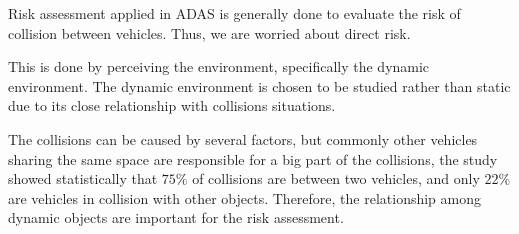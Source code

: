 Risk assessment applied in ADAS is generally done to evaluate the risk of collision between vehicles. Thus, we are worried about direct risk. 

This is done by perceiving the environment, specifically the dynamic environment. The dynamic environment is chosen to be studied rather than static due to its close relationship with  collisions situations. 

The collisions can be caused by several factors, but commonly other vehicles sharing the same space are responsible for a big part of the collisions, the study \cite{Hurt_1981} showed statistically that $75\%$ of collisions are between two vehicles, and only $22\%$ are vehicles in collision with other objects. Therefore, the relationship among dynamic objects are important for the risk assessment.

